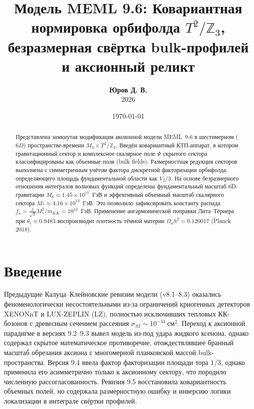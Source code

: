 \documentclass[12pt,a4paper]{article}
\title{\textbf{Модель MEML 9.6: Ковариантная нормировка орбифолда $T^2/\mathbb{Z}_3$,\\
безразмерная свёртка bulk-профилей и аксионный реликт}}
\author{\textbf{Юров Д. В.}\\2026}
\date{\today}
\begin{document}
\maketitle

\begin{abstract}
Представлена замкнутая модификация аксионной модели MEML~9.6 в шестимерном ($6D$) пространстве-времени $M_4 \times T^2/\mathbb{Z}_3$. Введён ковариантный КТП-аппарат, в котором гравитационный сектор и комплексное скалярное поле $\Phi$ скрытого сектора классифицированы как объемные поля (bulk fields). Размерностная редукция секторов выполнена с симметричным учётом фактора дискретной факторизации орбифолда, определяющего площадь фундаментальной области как $V_2/3$. На основе безразмерного отношения интегралов волновых функций определены фундаментальный масштаб 6D-гравитации $M_6 \approx 1.45 \times 10^{17}$~ГэВ и эффективный объемный масштаб скалярного сектора $M_* \approx 4.16 \times 10^{13}$~ГэВ. Это позволило зафиксировать константу распада $f_a = \frac{1}{\sqrt{3}}M_*^2/m_{KK} = 10^{12}$~ГэВ. Применение ангармонической поправки Лита--Тёрнера при $\theta_i \approx 0.9483$ воспроизводит плотность тёмной материи $\Omega_a h^2 = 0.120017$ (Planck 2018).
\end{abstract}

\section{Введение}
Предыдущие Калуца--Клейновские ревизии модели (v8.1--8.3) оказались феноменологически несостоятельными из-за ограничений криогенных детекторов XENONnT и LUX-ZEPLIN (LZ), полностью исключивших тепловых КК-бозонов с древесным сечением рассеяния $\sigma_{SI} \sim 10^{-44} \ \text{см}^2$. Переход к аксионной парадигме в версиях 9.2--9.3 вывел модель из-под удара жидкого ксенона, однако содержал скрытое математическое противоречие, отождествлявшее бранный масштаб обрезания аксиона с многомерной планковской массой bulk-пространства. Версия 9.4 ввела фактор факторизации площади тора $1/3$, однако применила его асимметрично только к аксионному сектору, что породило численную рассогласованность. Ревизия 9.5 восстановила ковариантность объемных полей, но содержала размерностную ошибку и инверсию логики локализации в интеграле свёртки профилей.
\end{document}
